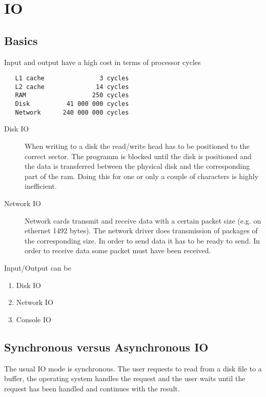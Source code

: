 \chapter{IO}

\section{Basics}

Input and output have a high cost in terms of processor cycles
{\small
\begin{verbatim}
   L1 cache               3 cycles
   L2 cache              14 cycles
   RAM                  250 cycles
   Disk          41 000 000 cycles
   Network      240 000 000 cycles
\end{verbatim}
}
%
\begin{description}

\item[Disk IO] When writing to a disk the read/write head has to be positioned
  to the correct sector. The programm is blocked until the disk is positioned
  and the data is transferred between the physical disk and the corresponding
  part of the ram. Doing this for one or only a couple of characters is highly
  inefficient.

\item[Network IO] Network cards transmit and receive data with a certain
  packet size (e.g. on ethernet 1492 bytes). The network driver does
  transmission of packages of the corresponding size. In order to send data it
  has to be ready to send. In order to receive data some packet must have been
  received.
\end{description}



Input/Output can be
\begin{enumerate}
\item Disk IO

\item Network IO

\item Console IO
\end{enumerate}






\section{Synchronous versus Asynchronous IO}

The usual IO mode is synchronous. The user requests to read from a disk file
to a buffer, the operating system handles the request and the user waits
until the request has been handled and continues with the result.

